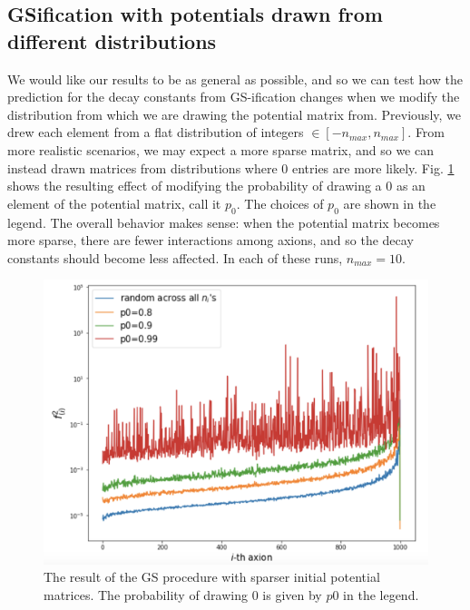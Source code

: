 \documentclass[11pt]{article}
\begin{document}

\pagebreak 

\subsection{GSification with potentials drawn from different distributions}

We would like our results to be as general as possible, and so we can test how the prediction for the decay constants from GS-ification changes when we modify the distribution from which we are drawing the potential matrix from. Previously, we drew each element from a flat distribution of integers $\in [-n_{max},n_{max}]$. From more realistic scenarios, we may expect a more sparse matrix, and so we can instead drawn matrices from distributions where 0 entries are more likely. Fig. \ref{fig:f-with-sparse-n} shows the resulting effect of modifying the probability of drawing a 0 as an element of the potential matrix, call it $p_0$. The choices of $p_0$ are shown in the legend. The overall behavior makes sense: when the potential matrix becomes more sparse, there are fewer interactions among axions, and so the decay constants should become less affected. In each of these runs, $n_{max}=10$.

\begin{figure}[h]
    \centering
    \includegraphics[width=0.7\linewidth]{figs/different-potential-dists.png}
    \caption{The result of the GS procedure with sparser initial potential matrices. The probability of drawing 0 is given by $p0$ in the legend.}
    \label{fig:f-with-sparse-n}
\end{figure}
\end{document}
